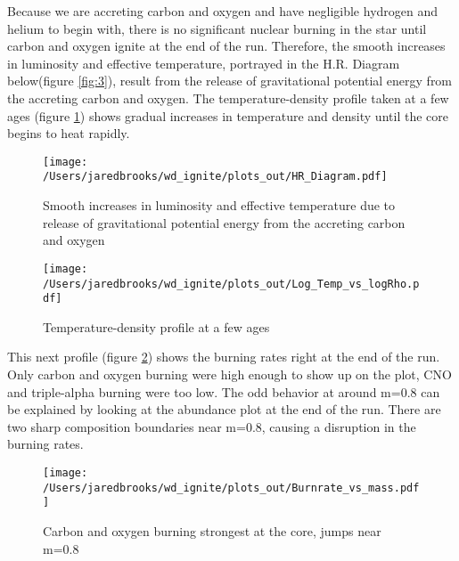 \documentclass{article}
\begin{document}
        \pagebreak

        Because we are accreting carbon and oxygen and have negligible hydrogen and helium to begin with, there is no significant nuclear burning in the star until carbon and oxygen ignite at the end of the run.  Therefore, the smooth increases in luminosity and effective temperature, portrayed in the H.R. Diagram below(figure \ref{fig:3}), result from the release of gravitational potential energy from the accreting carbon and oxygen.  The temperature-density profile taken at a few ages (figure \ref{fig:7}) shows gradual increases in temperature and density until the core begins to heat rapidly.

        \begin{figure}[H]
          \begin{minipage}[b]{0.5\linewidth}
            \centering
            \texttt{[image: /Users/jaredbrooks/wd\_ignite/plots\_out/HR\_Diagram.pdf]}
            \caption{Smooth increases in luminosity and effective temperature due to release of gravitational potential energy from the accreting carbon and oxygen}
            \label{fig:3}
          \end{minipage}
          \hspace{0cm}
          \begin{minipage}[b]{0.5\linewidth}
            \centering
            \texttt{[image: /Users/jaredbrooks/wd\_ignite/plots\_out/Log\_Temp\_vs\_logRho.pdf]}
            \caption{Temperature-density profile at a few ages}
            \label{fig:7}
          \end{minipage}
        \end{figure}
        
        \pagebreak

        This next profile (figure \ref{fig:4}) shows the burning rates right at the end of the run.  Only carbon and oxygen burning were high enough to show up on the plot, CNO and triple-alpha burning were too low.  The odd behavior at around m=0.8 can be explained by looking at the abundance plot at the end of the run.  There are two sharp composition boundaries near m=0.8, causing a disruption in the burning rates.

        \begin{figure}[H]
          \centering
          \texttt{[image: /Users/jaredbrooks/wd\_ignite/plots\_out/Burnrate\_vs\_mass.pdf]}
          \caption{\footnotesize Carbon and oxygen burning strongest at the core, jumps near m=0.8}
          \label{fig:4}
        \end{figure}
        
\end{document}
